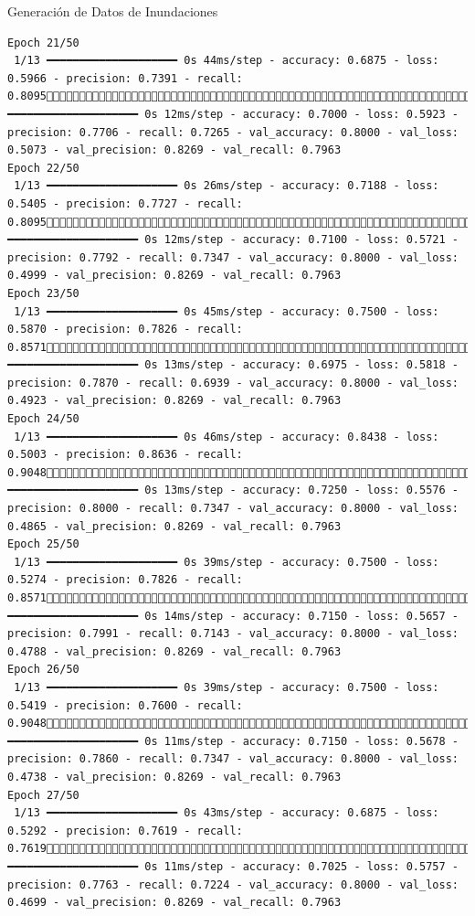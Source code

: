\documentclass[
  ignorenonframetext,
]{beamer}
\begin{document}
\begin{frame}[fragile]{Generación de Datos de Inundaciones}
\begin{verbatim}
Epoch 21/50
 1/13 ━━━━━━━━━━━━━━━━━━━━ 0s 44ms/step - accuracy: 0.6875 - loss: 0.5966 - precision: 0.7391 - recall: 0.809513/13 ━━━━━━━━━━━━━━━━━━━━ 0s 12ms/step - accuracy: 0.7000 - loss: 0.5923 - precision: 0.7706 - recall: 0.7265 - val_accuracy: 0.8000 - val_loss: 0.5073 - val_precision: 0.8269 - val_recall: 0.7963
Epoch 22/50
 1/13 ━━━━━━━━━━━━━━━━━━━━ 0s 26ms/step - accuracy: 0.7188 - loss: 0.5405 - precision: 0.7727 - recall: 0.809513/13 ━━━━━━━━━━━━━━━━━━━━ 0s 12ms/step - accuracy: 0.7100 - loss: 0.5721 - precision: 0.7792 - recall: 0.7347 - val_accuracy: 0.8000 - val_loss: 0.4999 - val_precision: 0.8269 - val_recall: 0.7963
Epoch 23/50
 1/13 ━━━━━━━━━━━━━━━━━━━━ 0s 45ms/step - accuracy: 0.7500 - loss: 0.5870 - precision: 0.7826 - recall: 0.857113/13 ━━━━━━━━━━━━━━━━━━━━ 0s 13ms/step - accuracy: 0.6975 - loss: 0.5818 - precision: 0.7870 - recall: 0.6939 - val_accuracy: 0.8000 - val_loss: 0.4923 - val_precision: 0.8269 - val_recall: 0.7963
Epoch 24/50
 1/13 ━━━━━━━━━━━━━━━━━━━━ 0s 46ms/step - accuracy: 0.8438 - loss: 0.5003 - precision: 0.8636 - recall: 0.904813/13 ━━━━━━━━━━━━━━━━━━━━ 0s 13ms/step - accuracy: 0.7250 - loss: 0.5576 - precision: 0.8000 - recall: 0.7347 - val_accuracy: 0.8000 - val_loss: 0.4865 - val_precision: 0.8269 - val_recall: 0.7963
Epoch 25/50
 1/13 ━━━━━━━━━━━━━━━━━━━━ 0s 39ms/step - accuracy: 0.7500 - loss: 0.5274 - precision: 0.7826 - recall: 0.857113/13 ━━━━━━━━━━━━━━━━━━━━ 0s 14ms/step - accuracy: 0.7150 - loss: 0.5657 - precision: 0.7991 - recall: 0.7143 - val_accuracy: 0.8000 - val_loss: 0.4788 - val_precision: 0.8269 - val_recall: 0.7963
Epoch 26/50
 1/13 ━━━━━━━━━━━━━━━━━━━━ 0s 39ms/step - accuracy: 0.7500 - loss: 0.5419 - precision: 0.7600 - recall: 0.904813/13 ━━━━━━━━━━━━━━━━━━━━ 0s 11ms/step - accuracy: 0.7150 - loss: 0.5678 - precision: 0.7860 - recall: 0.7347 - val_accuracy: 0.8000 - val_loss: 0.4738 - val_precision: 0.8269 - val_recall: 0.7963
Epoch 27/50
 1/13 ━━━━━━━━━━━━━━━━━━━━ 0s 43ms/step - accuracy: 0.6875 - loss: 0.5292 - precision: 0.7619 - recall: 0.761913/13 ━━━━━━━━━━━━━━━━━━━━ 0s 11ms/step - accuracy: 0.7025 - loss: 0.5757 - precision: 0.7763 - recall: 0.7224 - val_accuracy: 0.8000 - val_loss: 0.4699 - val_precision: 0.8269 - val_recall: 0.7963

\end{verbatim}
\end{frame}
\end{document}
